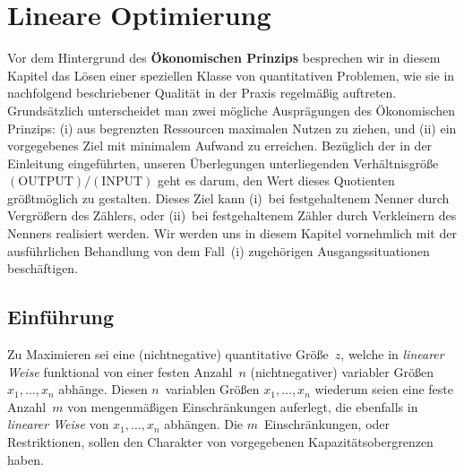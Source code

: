 \chapter[Lineare Optimierung]{Lineare Optimierung}
\hfill\hbox{}

\vspace{10mm}
\noindent
Vor dem Hintergrund des {\bf \"Okonomischen Prinzips} besprechen
wir in diesem Kapitel das L\"osen einer speziellen Klasse von
quantitativen Problemen, wie sie in nachfolgend beschriebener
Qualit\"at in der Praxis regelm\"a\ss ig auftreten.
Grunds\"atzlich unterscheidet man zwei m\"ogliche
Auspr\"agungen des \"Okonomischen Prinzips: (i) aus begrenzten
Ressourcen maximalen Nutzen zu ziehen, und (ii) ein vorgegebenes
Ziel mit minimalem Aufwand zu erreichen. Bez\"uglich der in
der Einleitung eingef\"uhrten, unseren \"Uberlegungen
unterliegenden Verh\"altnisgr\"o\ss e
$(\text{OUTPUT})/(\text{INPUT})$ geht es darum, den Wert dieses
Quotienten gr\"o\ss tm\"oglich zu gestalten. Dieses Ziel kann
(i)~bei festgehaltenem Nenner durch Vergr\"o\ss ern des Z\"ahlers,
oder (ii)~bei festgehaltenem Z\"ahler durch Verkleinern des Nenners
realisiert werden. Wir werden uns in diesem Kapitel vornehmlich mit
der ausf\"uhrlichen Behandlung von dem Fall~(i) zugeh\"origen
Ausgangssituationen besch\"aftigen.

\section[Einf\"uhrung]{Einf\"uhrung}
Zu Maximieren sei eine (nichtnegative) quantitative Gr\"o\ss e~$z$,
welche in {\em linearer Weise\/} funktional von einer festen
Anzahl~$n$ (nichtnegativer) variabler Gr\"o\ss en $x_{1}, \ldots,
x_{n}$ abh\"ange. Diesen $n$~variablen Gr\"o\ss en $x_{1}, \ldots,
x_{n}$ wiederum seien eine feste Anzahl~$m$ von mengenm\"a\ss igen
Einschr\"ankungen auferlegt, die ebenfalls in {\em linearer
Weise\/} von $x_{1}, \ldots, x_{n}$ abh\"angen. Die
$m$~Einschr\"ankungen, oder Restriktionen, sollen den Charakter
von vorgegebenen Kapazit\"atsobergrenzen haben.

